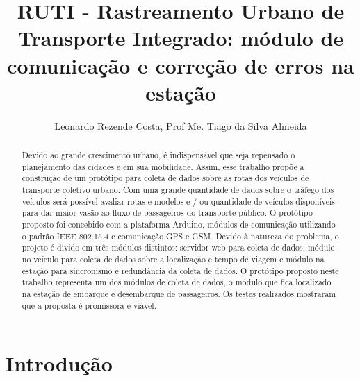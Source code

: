 \documentclass[12pt]{uftpibicsic2020}
\title{RUTI - Rastreamento Urbano de Transporte Integrado: módulo de comunicação e correção de erros na estação}
\author{Leonardo Rezende Costa\inst{1}, Prof Me. Tiago da Silva Almeida\inst{2}}
\begin{document}
\frontmatter
\maketitle


\begin{abstract}
Devido ao grande crescimento urbano, é indispensável que seja repensado o planejamento das cidades e em sua mobilidade. Assim, esse trabalho propõe a construção de um protótipo para coleta de dados sobre as rotas dos veículos de transporte coletivo urbano. Com uma grande quantidade de dados sobre o tráfego dos veículos será possível avaliar rotas e modelos e / ou quantidade de veículos disponíveis para dar maior vasão ao fluxo de passageiros do transporte público. O protótipo proposto foi concebido com a plataforma Arduino, módulos de comunicação utilizando o padrão IEEE 802.15.4 e comunicação GPS e GSM. Devido à natureza do problema, o projeto é divido em três módulos distintos: servidor web para coleta de dados, módulo no veículo para coleta de dados sobre a localização e tempo de viagem e módulo na estação para sincronismo e redundância da coleta de dados. O protótipo proposto neste trabalho representa um dos módulos de coleta de dados, o módulo que fica localizado na estação de embarque e desembarque de passageiros. Os testes realizados mostraram que a proposta é promissora e viável.
\end{abstract}

\mainmatter
\chapter{Introdução}\vskip -12pt

%
\end{document}
